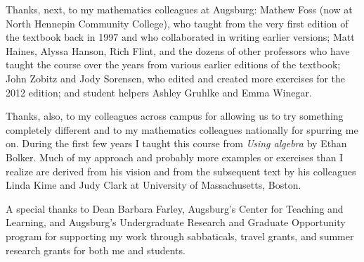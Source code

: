 Thanks, next, to my mathematics colleagues at Augsburg: Mathew Foss (now at North Hennepin Community College), who taught from the very first edition of the textbook back in 1997 and who collaborated in writing earlier versions; Matt Haines, Alyssa Hanson, Rich Flint, and the dozens of other professors who have taught the course over the years from various earlier editions of the textbook; John Zobitz and Jody Sorensen, who edited and created more exercises for the 2012 edition;  and student helpers Ashley Gruhlke and Emma Winegar.

Thanks, also, to my colleagues across campus for allowing us to try something completely different and to my mathematics colleagues nationally for spurring me on.  During the first few years I taught this course from \emph{Using algebra} by Ethan Bolker.  Much of my approach and probably more examples or exercises than I realize are derived from his vision and from the subsequent text by his colleagues Linda Kime and Judy Clark at University of Massachusetts, Boston.  

A special thanks to Dean Barbara Farley, Augsburg's Center for Teaching and Learning, and Augsburg's Undergraduate Research and Graduate Opportunity program for supporting my work through sabbaticals, travel grants, and summer research grants for both me and students.


